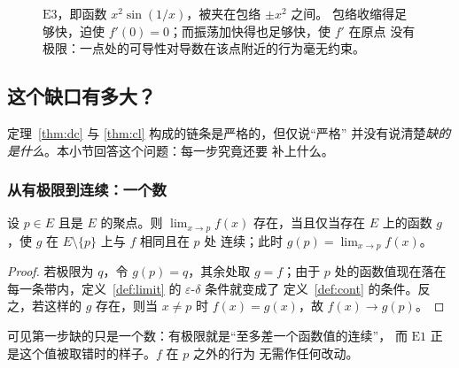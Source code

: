 \begin{figure}[htbp]
\centering
{}
\caption{$\mathrm{E}3$，即函数 $x^2\sin(1/x)$，被夹在包络 $\pm x^2$ 之间。
包络收缩得足够快，迫使 $f'(0)=0$；而振荡加快得也足够快，使 $f'$ 在原点
没有极限：一点处的可导性对导数在该点附近的行为毫无约束。}
\label{fig:xsq}
\end{figure}

\subsection{这个缺口有多大？}
\label{sec:gap}

定理~\ref{thm:dc} 与 \ref{thm:cl} 构成的链条是严格的，但仅说“严格”
并没有说清楚\emph{缺的是什么}。本小节回答这个问题：每一步究竟还要
补上什么。

\subsubsection*{从有极限到连续：一个数}

\begin{proposition}\label{prop:gap1}
设 $p \in E$ 且是 $E$ 的聚点。则 $\lim_{x\to p}f(x)$ 存在，当且仅当存在
$E$ 上的函数 $g$，使 $g$ 在 $E\setminus\{p\}$ 上与 $f$ 相同且在 $p$ 处
连续；此时 $g(p) = \lim_{x\to p}f(x)$。
\end{proposition}

\begin{proof}
若极限为 $q$，令 $g(p)=q$，其余处取 $g=f$；由于 $p$ 处的函数值现在落在
每一条带内，定义~\ref{def:limit} 的 $\varepsilon$-$\delta$ 条件就变成了
定义~\ref{def:cont} 的条件。反之，若这样的 $g$ 存在，则当 $x \ne p$ 时
$f(x)=g(x)$，故 $f(x) \to g(p)$。
\end{proof}

可见第一步缺的只是一个数：有极限就是“至多差一个函数值的连续”，
而 $\mathrm{E}1$ 正是这个值被取错时的样子。$f$ 在 $p$ 之外的行为
无需作任何改动。

